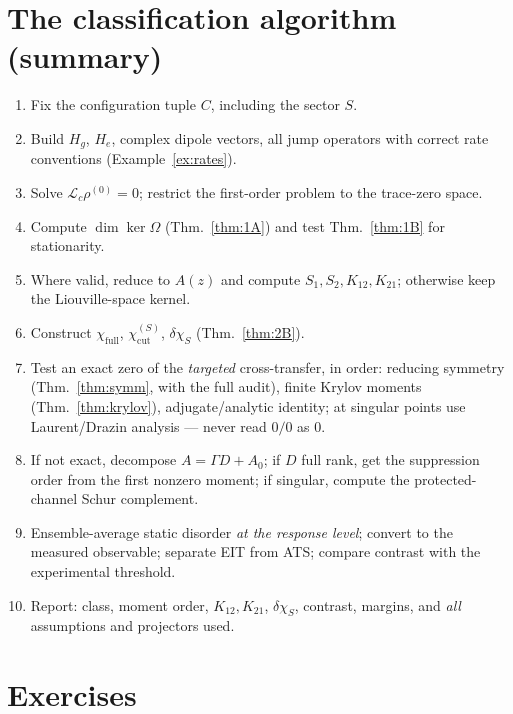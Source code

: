 \documentclass[11pt,a4paper]{article}
\theoremstyle{remark}
\newcommand{\dchi}{\delta\chi_{S}}
\newcommand{\chifull}{\chi_{\mathrm{full}}}
\newcommand{\chicut}{\chi^{(S)}_{\mathrm{cut}}}
\begin{document}
\section{The classification algorithm (summary)}

\begin{enumerate}
\item Fix the configuration tuple $C$, including the sector $S$.
\item Build $H_g$, $H_e$, complex dipole vectors, all jump operators with
      correct rate conventions (Example~\ref{ex:rates}).
\item Solve $\mathcal L_c\rho^{(0)}=0$; restrict the first-order problem to
      the trace-zero space.
\item Compute $\dim\ker\Omega$ (Thm.~\ref{thm:1A}) and test
      Thm.~\ref{thm:1B} for stationarity.
\item Where valid, reduce to $A(z)$ and compute $S_1,S_2,K_{12},K_{21}$;
      otherwise keep the Liouville-space kernel.
\item Construct $\chifull$, $\chicut$, $\dchi$ (Thm.~\ref{thm:2B}).
\item Test an exact zero of the \emph{targeted} cross-transfer, in order:
      reducing symmetry (Thm.~\ref{thm:symm}, with the full audit),
      finite Krylov moments (Thm.~\ref{thm:krylov}),
      adjugate/analytic identity; at singular points use Laurent/Drazin
      analysis --- never read $0/0$ as $0$.
\item If not exact, decompose $A=\Gamma D+A_0$; if $D$ full rank, get the
      suppression order from the first nonzero moment; if singular, compute
      the protected-channel Schur complement.
\item Ensemble-average static disorder \emph{at the response level};
      convert to the measured observable; separate EIT from ATS;
      compare contrast with the experimental threshold.
\item Report: class, moment order, $K_{12},K_{21}$, $\dchi$, contrast,
      margins, and \emph{all} assumptions and projectors used.
\end{enumerate}

\section{Exercises}
\end{document}
